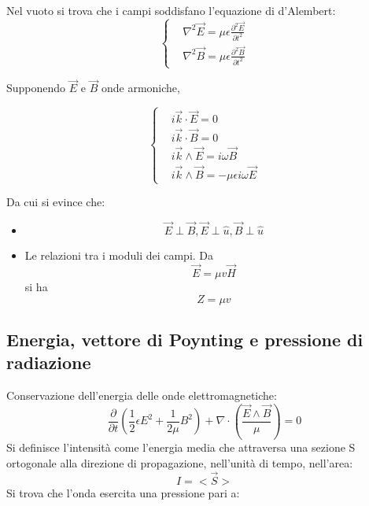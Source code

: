 \documentclass{article}
\begin{document}
Nel vuoto si trova che i campi soddisfano l'equazione di d'Alembert:
\begin{equation}
\left\{
    \begin{aligned}
        & \nabla^2 \Vec{E}= \mu\epsilon\frac{\partial^2 \Vec{E}}{\partial t^2}\\
         & \nabla^2 \Vec{B}= \mu\epsilon\frac{\partial^2 \Vec{B}}{\partial t^2}
    \end{aligned}
    \right.
\end{equation}

Supponendo $\Vec{E}$ e $\Vec{B}$ onde armoniche,

\begin{equation}
    \left\{\begin{aligned}
        & i \Vec{k} \cdot \Vec{E}=0 \\
        & i \Vec{k} \cdot \Vec{B}=0 \\
        & i \Vec{k} \wedge  \Vec{E}=i\omega \Vec{B} \\
        &  i \Vec{k} \wedge \Vec{B}= -\mu\epsilon i \omega \Vec{E}
    \end{aligned}
    \right.
\end{equation}

Da cui si evince che:
\begin{itemize}
    \item \begin{equation}
        \Vec{E}\perp \Vec{B}, \Vec{E}\perp \hat{u}, \Vec{B} \perp \hat{u}
    \end{equation}

    \item Le relazioni tra i moduli dei campi. Da
    \begin{equation}
        \Vec{E}=\mu v \Vec{H}
    \end{equation}
    si ha
    \begin{equation}
        Z= \mu v
    \end{equation}
    
\end{itemize}

\subsection{Energia, vettore di Poynting e pressione di radiazione}
Conservazione dell'energia delle onde elettromagnetiche:
\begin{equation}
    \frac{\partial}{\partial t}\left( \frac{1}{2}\epsilon E^2+ \frac{1}{2\mu}B^2 \right)+\nabla\cdot\left( \frac{\Vec{E}\wedge \Vec{B}}{\mu}\right)=0
\end{equation}
Si definisce l'intensità come l'energia media che attraversa una sezione S ortogonale alla direzione di propagazione, nell'unità di tempo, nell'area:
\begin{equation}
I=<\Vec{S}>
\end{equation}
Si trova che l'onda esercita una pressione pari a:
\end{document}
